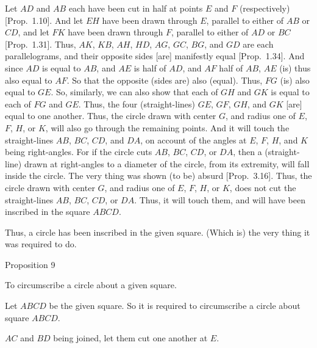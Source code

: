 \epsfysize=2.2in
\centerline{}

Let  $AD$ and $AB$ each have been cut in half at points $E$ and $F$ (respectively)
[Prop.~1.10]. And let $EH$ have been drawn through $E$, parallel
to either of $AB$ or $CD$, and let $FK$ have been drawn through $F$, parallel to either of $AD$ or $BC$ [Prop.~1.31].
Thus, $AK$, $KB$, $AH$, $HD$, $AG$, $GC$, $BG$, and $GD$ are each parallelograms,
and their opposite sides [are] manifestly equal [Prop.~1.34].
And since $AD$ is equal to $AB$, and $AE$ is half of $AD$, and $AF$ half of
$AB$, $AE$ (is) thus also equal to $AF$. So that the opposite (sides are) also (equal).
Thus, $FG$ (is) also equal to $GE$. So, similarly, we can also show that each of
$GH$ and $GK$ is equal to each of $FG$ and $GE$. Thus, the four (straight-lines)
$GE$, $GF$, $GH$, and $GK$ [are] equal to one another. Thus, the circle drawn
with center $G$, and radius one of $E$, $F$, $H$, or $K$, will also go through the remaining points. And it will touch the straight-lines $AB$, $BC$, $CD$, and $DA$,
on account of the angles at $E$, $F$, $H$, and $K$ being right-angles. For if the
circle cuts $AB$, $BC$, $CD$, or $DA$, then a (straight-line) drawn at right-angles to a diameter of the circle, from its extremity, will fall inside the circle. 
The very thing was shown (to be) absurd [Prop.~3.16].  Thus, the
circle drawn with center $G$, and radius one of $E$, $F$, $H$, or $K$, does not
cut the straight-lines $AB$, $BC$, $CD$, or $DA$. Thus, it will touch them, and will
have been inscribed in the square $ABCD$.

Thus, a circle has been inscribed in the given square. (Which is) the very thing it was required to do.


\begin{center}
{\large Proposition 9}
\end{center}

To  circumscribe a circle about a given square.

Let $ABCD$ be the given square. So it is required to circumscribe a circle about
square $ABCD$.

$AC$ and $BD$ being joined, let them cut one another at $E$.

\epsfysize=2.2in
\centerline{}

